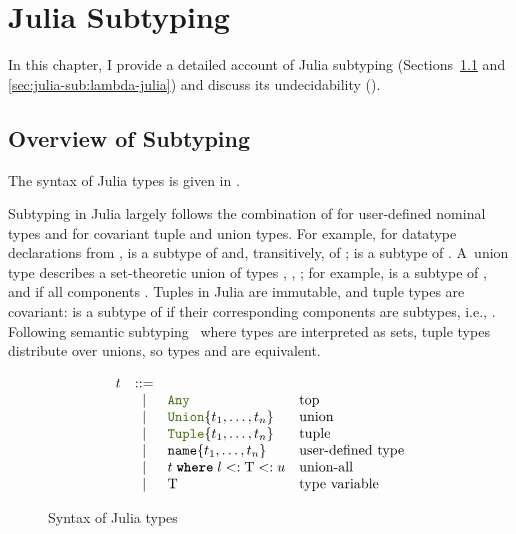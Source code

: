 \chapter{Julia Subtyping}%
\label{chap:julia-sub}

In this chapter, I provide a detailed account of Julia subtyping
(Sec\-tions~\ref{sec:julia-sub:overview} and \ref{sec:julia-sub:lambda-julia})
and discuss its undecidability ().

\section{Overview of Subtyping}\label{sec:julia-sub:overview}

The syntax of Julia types is given in .

Subtyping in Julia largely follows the combination of
 for user-defined nominal types and
 for covariant tuple and union types.
For example, for datatype declarations from , 
 is a subtype of  and, transitively, of ;
 is a subtype of .
A~union type  describes a set-theoretic union of
types , , ; for example,  is a subtype of
, and  if all
components .
Tuples in Julia are immutable, and tuple types are covariant:
 is a subtype of  if
their corresponding components are subtypes, i.e., .
Following semantic subtyping~\cite{bib:frisch:sem-sub:2008}
where types are interpreted as sets,
tuple types distribute over unions,
so types  and
 are equivalent.

\begin{figure}[t]
\footnotesize
\[
\begin{array}{ccll}
  \t &::=& & \\
     &\mid& \anytyp & \text{top} \\
     &\mid& \uniontyp{\t_1, \ldots, \t_n} & \text{union} \\
     &\mid& \tupletyp{\t_1, \ldots, \t_n} & \text{tuple} \\
     &\mid& \cstrt{name}{\t_1, \ldots, \t_n} & \text{user-defined type} \\
     &\mid& \wheret{\t}{l <: \T <: u} & \text{union-all} \\
     &\mid& \T & \text{type variable} \\
\end{array}
\]
\caption{Syntax of Julia types}\label{fig:jltypes}
\end{figure}

